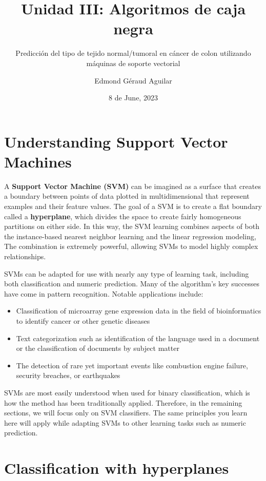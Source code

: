 \documentclass[
]{article}
\title{Unidad III: Algoritmos de caja negra}
\subtitle{Predicción del tipo de tejido normal/tumoral en cáncer de
colon utilizando máquinas de soporte vectorial}
\author{Edmond Géraud Aguilar}
\date{8 de June, 2023}
\providecommand{\tightlist}{%
  \setlength{\itemsep}{0pt}\setlength{\parskip}{0pt}}
\begin{document}
\maketitle

{
\hypersetup{linkcolor=}
\setcounter{tocdepth}{2}
\tableofcontents
}
\hypertarget{understanding-support-vector-machines}{%
\section{Understanding Support Vector
Machines}\label{understanding-support-vector-machines}}

A \textbf{Support Vector Machine (SVM)} can be imagined as a surface
that creates a boundary between points of data plotted in
multidimensional that represent examples and their feature values. The
goal of a SVM is to create a flat boundary called a \textbf{hyperplane},
which divides the space to create fairly homogeneous partitions on
either side. In this way, the SVM learning combines aspects of both the
instance-based nearest neighbor learning and the linear regression
modeling, The combination is extremely powerful, allowing SVMs to model
highly complex relationships.

SVMs can be adapted for use with nearly any type of learning task,
including both classification and numeric prediction. Many of the
algorithm's key successes have come in pattern recognition. Notable
applications include:

\begin{itemize}
\tightlist
\item
  Classification of microarray gene expression data in the field of
  bioinformatics to identify cancer or other genetic diseases
\item
  Text categorization such as identification of the language used in a
  document or the classification of documents by subject matter
\item
  The detection of rare yet important events like combustion engine
  failure, security breaches, or earthquakes
\end{itemize}

SVMs are most easily understood when used for binary classification,
which is how the method has been traditionally applied. Therefore, in
the remaining sections, we will focus only on SVM classifiers. The same
principles you learn here will apply while adapting SVMs to other
learning tasks such as numeric prediction.

\hypertarget{classification-with-hyperplanes}{%
\section{Classification with
hyperplanes}\label{classification-with-hyperplanes}}
\end{document}
